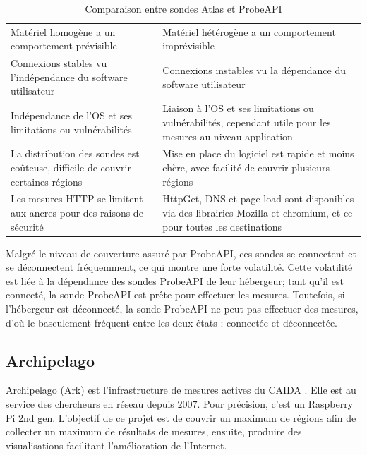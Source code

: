 \begin{table}[h]
	\centering
	\begin{adjustbox}{max width=\textwidth}
		\begin{tabularx}{\textwidth}{|X|X|}
			\hline
			\thead{Sonde Atlas}& \thead{ProbeAPI} \\ \hline
			Matériel homogène a un comportement  prévisible&  Matériel hétérogène a un  comportement imprévisible \\ \hline
			Connexions stables vu l'indépendance du software utilisateur& Connexions instables vu la dépendance du software utilisateur\\ \hline
			Indépendance  de l'OS et ses limitations ou vulnérabilités&  Liaison à l'OS et ses limitations ou vulnérabilités, cependant utile pour les mesures au niveau application \\ \hline
			La distribution des sondes est coûteuse, difficile de couvrir certaines régions&  Mise en place du logiciel est rapide et moins chère, avec facilité de couvrir plusieurs régions\\ \hline
			Les mesures HTTP se limitent aux ancres	pour des raisons de sécurité& HttpGet, DNS et page-load sont disponibles via des librairies Mozilla et chromium, et ce pour toutes les destinations \\ \hline
			
		\end{tabularx}
	\end{adjustbox}
	\caption{Comparaison entre sondes  Atlas et ProbeAPI}
	\label{tab:compare-ripeatlas-probapi}
\end{table}

Malgré le niveau de couverture assuré par ProbeAPI, ces sondes se connectent et se déconnectent fréquemment, ce qui montre une forte volatilité. Cette volatilité est liée à la dépendance des sondes ProbeAPI de leur hébergeur; tant qu'il est connecté, la sonde ProbeAPI est prête pour effectuer les mesures. Toutefois, si l'hébergeur est déconnecté, la sonde ProbeAPI ne peut pas effectuer des mesures, d'où le basculement fréquent entre les deux états : connectée et déconnectée. 

\subsection{Archipelago}

Archipelago (Ark) \cite{Archipelago} est l'infrastructure de mesures actives du CAIDA \cite{CAIDA}. Elle est au service des chercheurs en réseau depuis $2007$. Pour précision, c'est un Raspberry Pi 2nd gen. L'objectif de ce projet est de couvrir un maximum de régions afin de collecter un maximum de résultats de mesures, ensuite, produire des visualisations facilitant l'amélioration  de l'Internet. 


